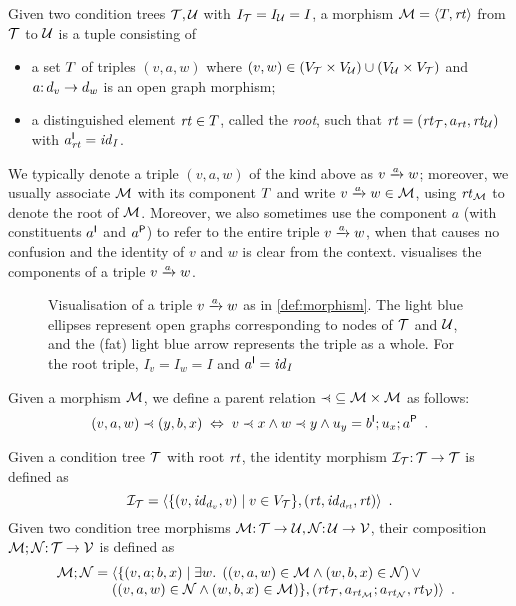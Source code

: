 \begin{definition}[morphism]\label{def:morphism}
Given two condition trees $\cT,\cU$ with $I_\cT=I_\cU=I$, a morphism $\cM=\tupof{\tp,\rt}$ from $\cT$ to $\cU$ is a tuple consisting of
\begin{itemize}
\item a set $\tp$ of triples $(v,a,w)$ where $(v,w)\in (V_\cT\times V_\cU) \cup (V_\cU\times V_\cT)$ and $a\of d_v\to d_w$ is an open graph morphism;
\item a distinguished element $\rt\in\tp$, called the \emph{root}, such that $\rt=(\rtof\cT,a_{\rt},\rtof\cU)$ with $a_{\rt}\I=\id_I$.
\end{itemize}
\end{definition}
%
We typically denote a triple $(v,a,w)$ of the kind above as $\trip vaw$; moreover, we usually associate $\cM$ with its component $\tp$ and write $\trip vaw\in\cM$, using $\rtof\cM$ to denote the root of $\cM$. Moreover, we also sometimes use the component $a$ (with constituents $a\I$ and $a\P$) to refer to the entire triple $\trip vaw$, when that causes no confusion and the identity of $v$ and $w$ is clear from the context.  visualises the components of a triple $\trip vaw$.

\begin{figure}
\centering

\caption{Visualisation of a triple $\trip vaw$ as in \cref{def:morphism}. The light blue ellipses represent open graphs corresponding to nodes of $\cT$ and $\cU$, and the (fat) light blue arrow represents the triple as a whole. For the root triple, $I_v=I_w=I$ and $a\I=\id_I$}
\label{fig:triple}
\end{figure}

\noindent Given a morphism $\cM$, we define a parent relation ${\parentof}\subseteq \cM\times \cM$ as follows:
\[ (v,a,w)\parentof (y,b,x) \;\Leftrightarrow\; v\parentof x\wedge w\parentof y \wedge u_y=b\I;u_x;a\P \enspace. \]

\medskip\noindent
Given a condition tree $\cT$ with root $\rt$, the identity morphism $\cI_\cT\of \cT\to\cT$ is defined as
\[ \cI_\cT = \tupof{\gensetof{(v,\id_{d_v},v)}{v\in V_\cT},(\rt,\id_{d_{\rt}},\rt)} \enspace. \]
Given two condition tree morphisms $\cM\of \cT\to \cU,\cN\of \cU\to \cV$, their composition $\cM;\cN\of \cT\to \cV$ is defined as
\[ \cM;\cN =
\begin{array}[t]{@{}l}
	\langle\{ (v,a;b,x) \mid \exists w\st \left( (v,a,w) \in \cM \wedge (w,b,x)\in \cN\right) \vee\\ 
	\left( (v,a,w) \in \cN \wedge (w,b,x)\in \cM\right)\},(\rtof\cT,a_{\rtof\cM};a_{\rtof\cN},\rtof\cV)\rangle\enspace.
\end{array}
\]
